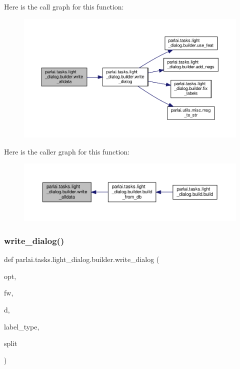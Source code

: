 Here is the call graph for this function\+:
\nopagebreak
\begin{figure}[H]
\begin{center}
\leavevmode
\includegraphics[width=350pt]{namespaceparlai_1_1tasks_1_1light__dialog_1_1builder_aeb144d0ebd2fd1727f73677e36f2c8b5_cgraph}
\end{center}
\end{figure}
Here is the caller graph for this function\+:
\nopagebreak
\begin{figure}[H]
\begin{center}
\leavevmode
\includegraphics[width=350pt]{namespaceparlai_1_1tasks_1_1light__dialog_1_1builder_aeb144d0ebd2fd1727f73677e36f2c8b5_icgraph}
\end{center}
\end{figure}
\mbox{\label{namespaceparlai_1_1tasks_1_1light__dialog_1_1builder_a233ecce0ba4b1a0c023e855629986d69}} 
\subsubsection{\texorpdfstring{write\+\_\+dialog()}{write\_dialog()}}
{\footnotesize\ttfamily def parlai.\+tasks.\+light\+\_\+dialog.\+builder.\+write\+\_\+dialog (\begin{DoxyParamCaption}\item[{}]{opt,  }\item[{}]{fw,  }\item[{}]{d,  }\item[{}]{label\+\_\+type,  }\item[{}]{split }\end{DoxyParamCaption})}



